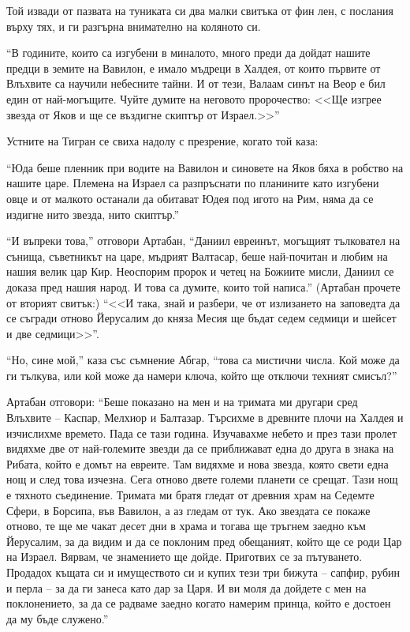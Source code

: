 \documentclass[oneside,10pt]{memoir}
\begin{document}
Той извади от пазвата на туниката си два малки свитъка от фин лен, с послания
върху тях, и ги разгърна внимателно на коляното си.

``В годините, които са изгубени в миналото, много преди да дойдат нашите предци
в земите на Вавилон, е имало мъдреци в Халдея, от които първите от Влъхвите са
научили небесните тайни. И от тези, Валаам синът на Веор е бил един от
най-могъщите. Чуйте думите на неговото пророчество: <<Ще изгрее звезда от Яков и
ще се въздигне скиптър от Израел.>>''

Устните на Тигран се свиха надолу с презрение, когато той каза:

``Юда беше пленник при водите на Вавилон и синовете на Яков бяха в робство на
нашите царе. Племена на Израел са разпръснати по планините като изгубени овце и
от малкото останали да обитават Юдея под игото на Рим, няма да се издигне нито
звезда, нито скиптър.''

``И въпреки това,'' отговори Артабан, ``Даниил евреинът, могъщият тълковател на
сънища, съветникът на царе, мъдрият Валтасар, беше най-почитан и любим на нашия
велик цар Кир. Неоспорим пророк и четец на Божиите мисли, Даниил се доказа пред
нашия народ. И това са думите, които той написа.'' (Артабан прочете от вторият
свитък:) ``<<И така, знай и разбери, че от излизането на заповедта да се съгради
отново Йерусалим до княза Месия ще бъдат седем седмици и шейсет и две
седмици>>''.

``Но, сине мой,'' каза със съмнение Абгар, ``това са мистични числа. Кой може да
ги тълкува, или кой може да намери ключа, който ще отключи техният смисъл?''

Артабан отговори: ``Беше показано на мен и на тримата ми другари сред Влъхвите
-- Каспар, Мелхиор и Балтазар. Търсихме в древните плочи на Халдея и изчислихме
времето. Пада се тази година. Изучавахме небето и през тази пролет видяхме две
от най-големите звезди да се приближават една до друга в знака на Рибата, който
е домът на евреите. Там видяхме и нова звезда, която свети една нощ и след това
изчезна. Сега отново двете големи планети се срещат. Тази нощ е тяхното
съединение. Тримата ми братя гледат от древния храм на Седемте Сфери, в Борсипа,
във Вавилон, а аз гледам от тук. Ако звездата се покаже отново, те ще ме чакат
десет дни в храма и тогава ще тръгнем заедно към Йерусалим, за да видим и да се
поклоним пред обещаният, който ще се роди Цар на Израел. Вярвам, че знамението
ще дойде. Приготвих се за пътуването. Продадох къщата си и имуществото си и
купих тези три бижута -- сапфир, рубин и перла -- за да ги занеса като дар за
Царя. И ви моля да дойдете с мен на поклонението, за да се радваме заедно когато
намерим принца, който е достоен да му бъде служено.''
\end{document}
